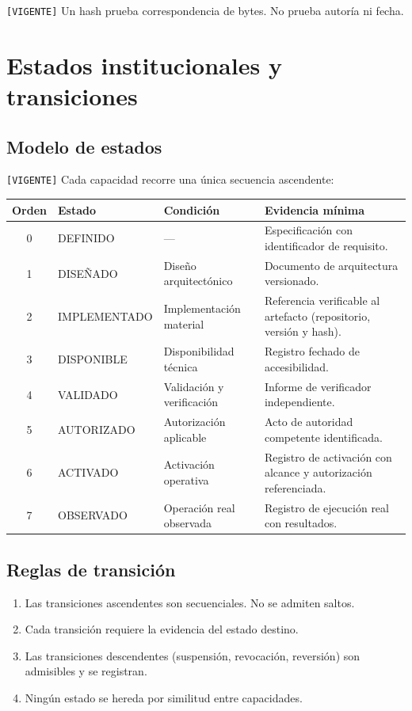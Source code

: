 \documentclass[12pt]{article}
\begin{document}
\texttt{[VIGENTE]} Un hash prueba correspondencia de bytes. No prueba autoría ni fecha.

\section{Estados institucionales y transiciones}
\label{sec:estados}

\subsection{Modelo de estados}

\texttt{[VIGENTE]} Cada capacidad recorre una única secuencia ascendente:

\begin{longtable}{|c|p{3.7cm}|p{3.4cm}|p{5.1cm}|}
\hline
\textbf{Orden} & \textbf{Estado} & \textbf{Condición} & \textbf{Evidencia mínima} \\
\hline
\endhead
0 & DEFINIDO & --- & Especificación con identificador de requisito. \\
\hline
1 & DISEÑADO & Diseño arquitectónico & Documento de arquitectura versionado. \\
\hline
2 & IMPLEMENTADO & Implementación material & Referencia verificable al artefacto (repositorio, versión y hash). \\
\hline
3 & DISPONIBLE & Disponibilidad técnica & Registro fechado de accesibilidad. \\
\hline
4 & VALIDADO & Validación y verificación & Informe de verificador independiente. \\
\hline
5 & AUTORIZADO & Autorización aplicable & Acto de autoridad competente identificada. \\
\hline
6 & ACTIVADO & Activación operativa & Registro de activación con alcance y autorización referenciada. \\
\hline
7 & OBSERVADO & Operación real observada & Registro de ejecución real con resultados. \\
\hline
\end{longtable}

\subsection{Reglas de transición}

\begin{enumerate}[label=\arabic*.]
    \item Las transiciones ascendentes son secuenciales. No se admiten saltos.
    \item Cada transición requiere la evidencia del estado destino.
    \item Las transiciones descendentes (suspensión, revocación, reversión) son admisibles y se registran.
    \item Ningún estado se hereda por similitud entre capacidades.
\end{enumerate}
\end{document}
